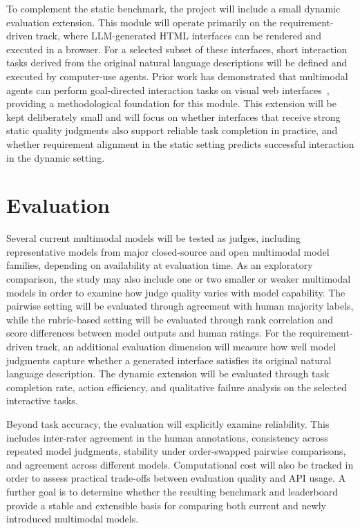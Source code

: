 \documentclass[pdflatex,sn-mathphys-num]{sn-jnl}
\begin{document}
To complement the static benchmark, the project will include a small dynamic evaluation
extension. This module will operate primarily on the requirement-driven track, where
LLM-generated HTML interfaces can be rendered and executed in a browser. For a selected
subset of these interfaces, short interaction tasks derived from the original natural
language descriptions will be defined and executed by computer-use agents. Prior work
has demonstrated that multimodal agents can perform goal-directed interaction tasks on
visual web interfaces~\cite{visualwebarena}, providing a methodological foundation for
this module. This extension will be kept deliberately small and will focus on whether
interfaces that receive strong static quality judgments also support reliable task
completion in practice, and whether requirement alignment in the static setting predicts
successful interaction in the dynamic setting.

\section{Evaluation}\label{sec:evaluation}

Several current multimodal models will be tested as judges, including representative
models from major closed-source and open multimodal model families, depending on
availability at evaluation time. As an exploratory comparison, the study may also
include one or two smaller or weaker multimodal models in order to examine how judge
quality varies with model capability. The pairwise setting will be evaluated through
agreement with human majority labels, while the rubric-based setting will be evaluated
through rank correlation and score differences between model outputs and human ratings.
For the requirement-driven track, an additional evaluation dimension will measure how
well model judgments capture whether a generated interface satisfies its original
natural language description. The dynamic extension will be evaluated through task
completion rate, action efficiency, and qualitative failure analysis on the selected
interactive tasks.

Beyond task accuracy, the evaluation will explicitly examine reliability. This includes
inter-rater agreement in the human annotations, consistency across repeated model
judgments, stability under order-swapped pairwise comparisons, and agreement across
different models. Computational cost will also be tracked in order to assess practical
trade-offs between evaluation quality and API usage. A further goal is to determine
whether the resulting benchmark and leaderboard provide a stable and extensible basis
for comparing both current and newly introduced multimodal models.
\end{document}
